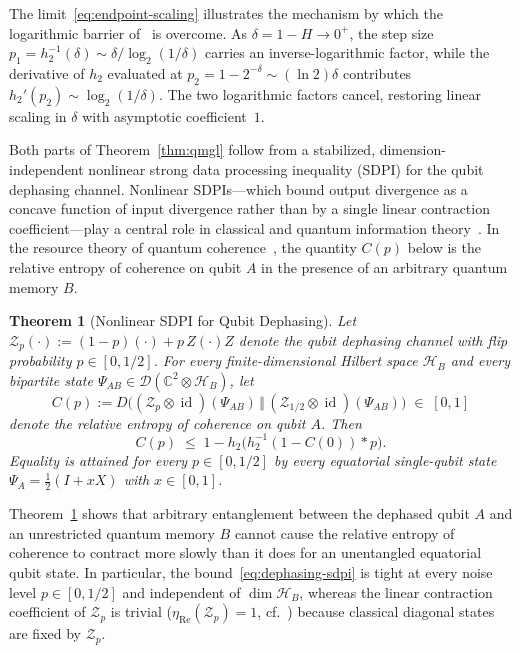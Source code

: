 \documentclass[10pt,a4paper]{article}
\numberwithin{equation}{section}
\theoremstyle{plain}
\newtheorem{theorem}{Theorem}[section]
\theoremstyle{definition}
\theoremstyle{remark}
\DeclareMathOperator{\id}{id}
\newcommand{\cH}{\mathcal{H}}
\newcommand{\cD}{\mathcal{D}}
\newcommand{\cZ}{\mathcal{Z}}
\newcommand{\bC}{\mathbb{C}}
\begin{document}
The limit~\eqref{eq:endpoint-scaling} illustrates the mechanism by which the logarithmic barrier of~\cite{HircheReeb2018} is overcome. As $\delta = 1 - H \to 0^+$, the step size $p_1 = h_2^{-1}(\delta) \sim \delta/\log_2(1/\delta)$ carries an inverse-logarithmic factor, while the derivative of $h_2$ evaluated at $p_2 = 1 - 2^{-\delta} \sim (\ln 2)\delta$ contributes $h_2'(p_2) \sim \log_2(1/\delta)$. The two logarithmic factors cancel, restoring linear scaling in $\delta$ with asymptotic coefficient~$1$.

Both parts of Theorem~\ref{thm:qmgl} follow from a stabilized, dimension-independent nonlinear strong data processing inequality (SDPI) for the qubit dephasing channel. Nonlinear SDPIs—which bound output divergence as a concave function of input divergence rather than by a single linear contraction coefficient—play a central role in classical and quantum information theory~\cite{PolyanskiyWu2017,Raginsky2016,HircheRouzeFranca2022}. In the resource theory of quantum coherence~\cite{BaumgratzCramerPlenio2014}, the quantity $C(p)$ below is the relative entropy of coherence on qubit $A$ in the presence of an arbitrary quantum memory $B$.

\begin{theorem}[Nonlinear SDPI for Qubit Dephasing]\label{thm:dephasing-sdpi}
Let $\cZ_p(\cdot) := (1-p)(\cdot) + p\, Z(\cdot)Z$ denote the qubit dephasing channel with flip probability $p \in [0, 1/2]$. For every finite-dimensional Hilbert space $\cH_B$ and every bipartite state $\Psi_{AB} \in \cD(\bC^2 \otimes \cH_B)$, let
\[
C(p) := D\!\bigl((\cZ_p \otimes \id)(\Psi_{AB}) \,\Vert\, (\cZ_{1/2} \otimes \id)(\Psi_{AB})\bigr) \;\in\; [0,1]
\]
denote the relative entropy of coherence on qubit $A$. Then
\begin{equation}\label{eq:dephasing-sdpi}
C(p) \;\le\; 1 - h_2\!\bigl(h_2^{-1}(1 - C(0)) * p\bigr).
\end{equation}
Equality is attained for every $p \in [0, 1/2]$ by every equatorial single-qubit state $\Psi_A = \frac{1}{2}(I + xX)$ with $x \in [0,1]$.
\end{theorem}

Theorem~\ref{thm:dephasing-sdpi} shows that arbitrary entanglement between the dephased qubit $A$ and an unrestricted quantum memory $B$ cannot cause the relative entropy of coherence to contract more slowly than it does for an unentangled equatorial qubit state. In particular, the bound~\eqref{eq:dephasing-sdpi} is tight at every noise level $p \in [0,1/2]$ and independent of $\dim \cH_B$, whereas the linear contraction coefficient of $\cZ_p$ is trivial ($\eta_{\mathrm{Re}}(\cZ_p) = 1$, cf.~\cite{HircheRouzeFranca2022}) because classical diagonal states are fixed by $\cZ_p$.
\end{document}
